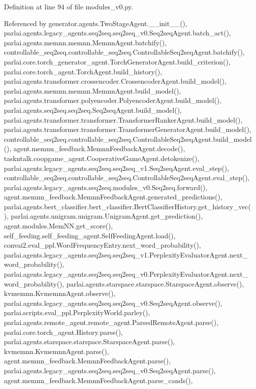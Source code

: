 Definition at line 94 of file modules\+\_\+v0.\+py.



Referenced by generator.\+agents.\+Two\+Stage\+Agent.\+\_\+\+\_\+init\+\_\+\+\_\+(), parlai.\+agents.\+legacy\+\_\+agents.\+seq2seq.\+seq2seq\+\_\+v0.\+Seq2seq\+Agent.\+batch\+\_\+act(), parlai.\+agents.\+memnn.\+memnn.\+Memnn\+Agent.\+batchify(), controllable\+\_\+seq2seq.\+controllable\+\_\+seq2seq.\+Controllable\+Seq2seq\+Agent.\+batchify(), parlai.\+core.\+torch\+\_\+generator\+\_\+agent.\+Torch\+Generator\+Agent.\+build\+\_\+criterion(), parlai.\+core.\+torch\+\_\+agent.\+Torch\+Agent.\+build\+\_\+history(), parlai.\+agents.\+transformer.\+crossencoder.\+Crossencoder\+Agent.\+build\+\_\+model(), parlai.\+agents.\+memnn.\+memnn.\+Memnn\+Agent.\+build\+\_\+model(), parlai.\+agents.\+transformer.\+polyencoder.\+Polyencoder\+Agent.\+build\+\_\+model(), parlai.\+agents.\+seq2seq.\+seq2seq.\+Seq2seq\+Agent.\+build\+\_\+model(), parlai.\+agents.\+transformer.\+transformer.\+Transformer\+Ranker\+Agent.\+build\+\_\+model(), parlai.\+agents.\+transformer.\+transformer.\+Transformer\+Generator\+Agent.\+build\+\_\+model(), controllable\+\_\+seq2seq.\+controllable\+\_\+seq2seq.\+Controllable\+Seq2seq\+Agent.\+build\+\_\+model(), agent.\+memnn\+\_\+feedback.\+Memnn\+Feedback\+Agent.\+decode(), taskntalk.\+coopgame\+\_\+agent.\+Cooperative\+Game\+Agent.\+detokenize(), parlai.\+agents.\+legacy\+\_\+agents.\+seq2seq.\+seq2seq\+\_\+v1.\+Seq2seq\+Agent.\+eval\+\_\+step(), controllable\+\_\+seq2seq.\+controllable\+\_\+seq2seq.\+Controllable\+Seq2seq\+Agent.\+eval\+\_\+step(), parlai.\+agents.\+legacy\+\_\+agents.\+seq2seq.\+modules\+\_\+v0.\+Seq2seq.\+forward(), agent.\+memnn\+\_\+feedback.\+Memnn\+Feedback\+Agent.\+generated\+\_\+predictions(), parlai.\+agents.\+bert\+\_\+classifier.\+bert\+\_\+classifier.\+Bert\+Classifier\+History.\+get\+\_\+history\+\_\+vec(), parlai.\+agents.\+unigram.\+unigram.\+Unigram\+Agent.\+get\+\_\+prediction(), agent.\+modules.\+Mem\+N\+N.\+get\+\_\+score(), self\+\_\+feeding.\+self\+\_\+feeding\+\_\+agent.\+Self\+Feeding\+Agent.\+load(), convai2.\+eval\+\_\+ppl.\+Word\+Frequency\+Entry.\+next\+\_\+word\+\_\+probability(), parlai.\+agents.\+legacy\+\_\+agents.\+seq2seq.\+seq2seq\+\_\+v1.\+Perplexity\+Evaluator\+Agent.\+next\+\_\+word\+\_\+probability(), parlai.\+agents.\+legacy\+\_\+agents.\+seq2seq.\+seq2seq\+\_\+v0.\+Perplexity\+Evaluator\+Agent.\+next\+\_\+word\+\_\+probability(), parlai.\+agents.\+starspace.\+starspace.\+Starspace\+Agent.\+observe(), kvmemnn.\+Kvmemnn\+Agent.\+observe(), parlai.\+agents.\+legacy\+\_\+agents.\+seq2seq.\+seq2seq\+\_\+v0.\+Seq2seq\+Agent.\+observe(), parlai.\+scripts.\+eval\+\_\+ppl.\+Perplexity\+World.\+parley(), parlai.\+agents.\+remote\+\_\+agent.\+remote\+\_\+agent.\+Parsed\+Remote\+Agent.\+parse(), parlai.\+core.\+torch\+\_\+agent.\+History.\+parse(), parlai.\+agents.\+starspace.\+starspace.\+Starspace\+Agent.\+parse(), kvmemnn.\+Kvmemnn\+Agent.\+parse(), agent.\+memnn\+\_\+feedback.\+Memnn\+Feedback\+Agent.\+parse(), parlai.\+agents.\+legacy\+\_\+agents.\+seq2seq.\+seq2seq\+\_\+v0.\+Seq2seq\+Agent.\+parse(), agent.\+memnn\+\_\+feedback.\+Memnn\+Feedback\+Agent.\+parse\+\_\+cands(), 